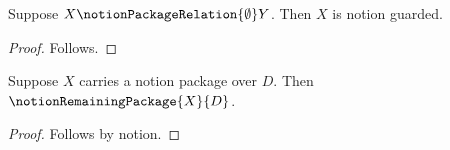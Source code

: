 

\begin{proposition}\label{notion_package_import_formation}
    Suppose $X\notionPackageRelation{\emptyset}Y$.
    Then $X$ is notion guarded.
\end{proposition}
\begin{proof}
    Follows.
\end{proof}

\begin{proposition}\label{notion_package_import_replay}
    Suppose $X$ carries a notion package over $D$.
    Then $\notionRemainingPackage{X}{D}$.
\end{proposition}
\begin{proof}
    Follows by notion.
\end{proof}
